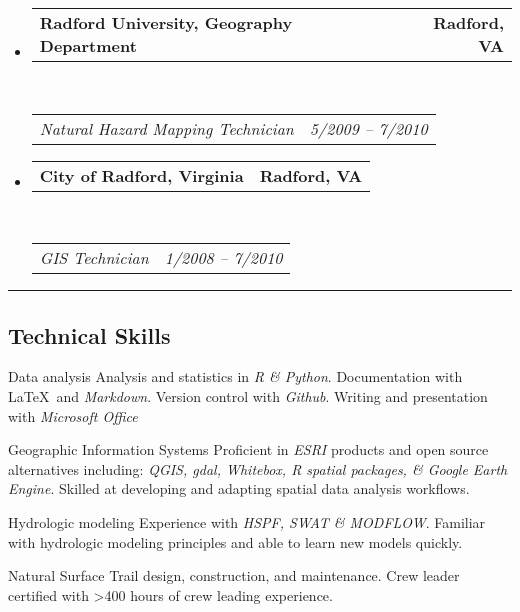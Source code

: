 \documentclass[10pt,letterpaper]{article}
\makeatletter
\newenvironment{indentsection}[1]%
{\begin{list}{}%
		{\setlength{\leftmargin}{#1}}%
		\item[]%
	}
	{\end{list}}
\newcommand{\headerrow}[2]
{\begin{tabular*}{\linewidth}{l@{\extracolsep{\fill}}r}
		#1 &
		#2 \\
\end{tabular*}}
\makeatother
\begin{document}
\begin{itemize}
\begin{itemize*}
		\end{itemize*}
		
		\item
		\headerrow
		{\textbf{Radford University, Geography Department}}
		{\textbf{Radford, VA}}
		\\
		\headerrow
		{\emph{Natural Hazard Mapping Technician}}
		{\emph{5/2009 -- 7/2010}}
		
		\item
		\headerrow
		{\textbf{City of Radford, Virginia}}
		{\textbf{Radford, VA}}
		\\
		\headerrow
		{\emph{GIS Technician}}
		{\emph{1/2008 -- 7/2010}}
		
	\end{itemize}
	
	\hrule
	\vspace{-0.4em}
	\subsection*{Technical Skills}
	
	\begin{indentsection}{\parindent}
		\begin{description*}
			\item[Data analysis]
			Analysis and statistics in \textit{R \& Python}. Documentation with \LaTeX\ and \textit{Markdown}. Version control with \textit{Github}. Writing and presentation with \textit{Microsoft Office}
			\item[Geographic Information Systems]
			Proficient in \textit{ESRI} products and open source alternatives including: \textit{QGIS, gdal, Whitebox, R spatial packages, \& Google Earth Engine}. Skilled at developing and adapting spatial data analysis workflows.
			\item[Hydrologic modeling]
			Experience with \textit{HSPF, SWAT \& MODFLOW}. Familiar with hydrologic modeling principles and able to learn new models quickly.
			\item[Natural Surface Trail] design, construction, and maintenance. Crew leader certified with >400 hours of crew leading experience.
		\end{description*}
	\end{indentsection}
	
\end{document}
